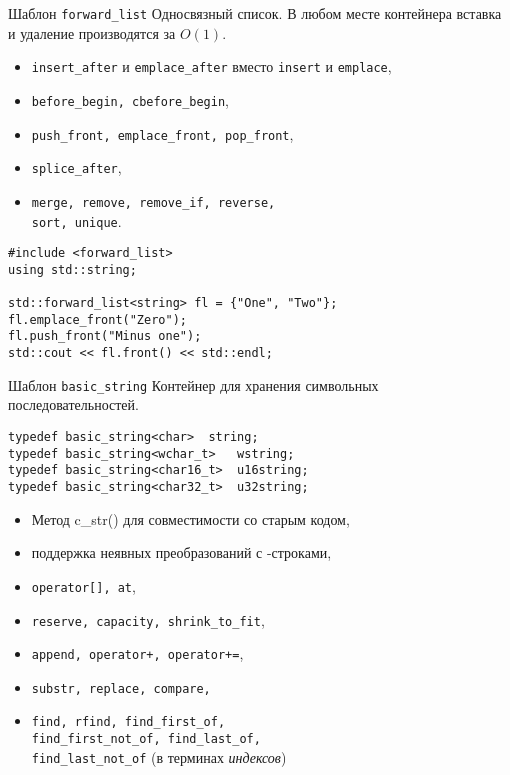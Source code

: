\documentclass{beamer}
\begin{document}
\begin{frame}[fragile]{Шаблон \texttt{forward\_list}}
Односвязный список. В любом месте контейнера 
вставка и удаление производятся за $O(1)$.
\begin{itemize}
    \item \texttt{insert\_after} и \texttt{emplace\_after} вместо \texttt{insert} и \texttt{emplace},
    \item  \texttt{before\_begin, cbefore\_begin},
    \item {\tt push\_front, emplace\_front, pop\_front},
    \item {\tt splice\_after},
    \item {\tt merge, remove, remove\_if, reverse,\\ sort, unique}.
\end{itemize}

\begin{lstlisting}
#include <forward_list>
using std::string;

std::forward_list<string> fl = {"One", "Two"};
fl.emplace_front("Zero");
fl.push_front("Minus one");
std::cout << fl.front() << std::endl;
\end{lstlisting}
\end{frame}

\begin{frame}[fragile]{Шаблон {\tt basic\_string}}
Контейнер для хранения символьных последовательностей.
\begin{lstlisting}
typedef basic_string<char>	string;
typedef basic_string<wchar_t> 	wstring;
typedef basic_string<char16_t> 	u16string;
typedef basic_string<char32_t>	u32string;
\end{lstlisting}
\begin{itemize}
    \item Метод {c\_str()} для совместимости со старым кодом, 
    \item поддержка неявных преобразований с \langc-строками,
    \item \texttt{operator[], at},
    \item \texttt{reserve, capacity, shrink\_to\_fit},
    \item \texttt{append, operator+, operator+=},
    \item \texttt{substr, replace, compare,} 
    \item \texttt{find, rfind, find\_first\_of,\\ find\_first\_not\_of,
    find\_last\_of,\\ find\_last\_not\_of} (в терминах {\em индексов})
\end{itemize}
\end{frame}
\end{document}
